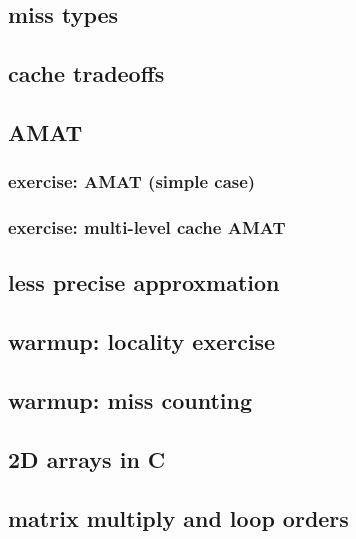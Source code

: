 \subsection{miss types}


\subsection{cache tradeoffs}


\subsection{AMAT}


\subsubsection{exercise: AMAT (simple case)}


\subsubsection{exercise: multi-level cache AMAT}


\subsection{less precise approxmation}


\subsection{warmup: locality exercise}  %


\subsection{warmup: miss counting}


\subsection{2D arrays in C}



\subsection{matrix multiply and loop orders}

%


